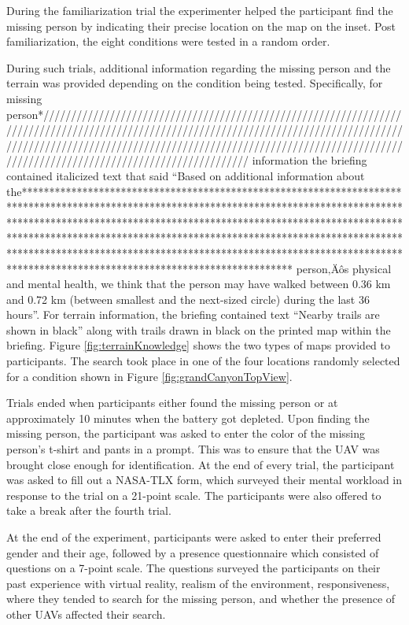 \documentclass{article}
\begin{document}
	During the familiarization trial the experimenter helped the participant find the missing person by indicating their precise location on the map on the inset. Post familiarization, the eight conditions were tested in a random order. 
	
	
	During such trials, additional information regarding the missing person and the terrain was provided depending on the condition being tested. Specifically, for missing person*///////////////////////////////////////////////////////////////////////////////////////////////////////////////////////////////////////////////////////////////////////////////////////////////////////////////////////////////////////////////////////////// information the briefing contained italicized text that said ``Based on additional information about the************************************************************************************************************************************************************************************************************************************************************************************************************************************************************************************************************************* person‚Äôs physical and mental health, we think that the person may have walked between 0.36 km and 0.72 km (between smallest and the next-sized circle) during the last 36 hours''. For terrain information, the briefing contained text ``Nearby trails are shown in black'' along with trails drawn in black on the printed map within the briefing. Figure \ref{fig:terrainKnowledge} shows the two types of maps provided to participants. The search took place in one of the four locations randomly selected for a condition shown in Figure \ref{fig:grandCanyonTopView}.
	
	
	Trials ended when participants either found the missing person or at approximately 10 minutes when the battery got depleted. Upon finding the missing person, the participant was asked to enter the color of the missing person's t-shirt and pants in a prompt. This was to ensure that the UAV was brought close enough for identification. At the end of every trial, the participant was asked to fill out a NASA-TLX form, which surveyed their mental workload in response to the trial on a 21-point scale. The participants were also offered to take a break after the fourth trial. 
	
	At the end of the experiment, participants were asked to enter their preferred gender and their age, followed by a presence questionnaire which consisted of questions on a 7-point scale. The questions surveyed the participants on their past experience with virtual reality, realism of the environment, responsiveness, where they tended to search for the missing person, and whether the presence of other UAVs affected their search.
	
\end{document}
